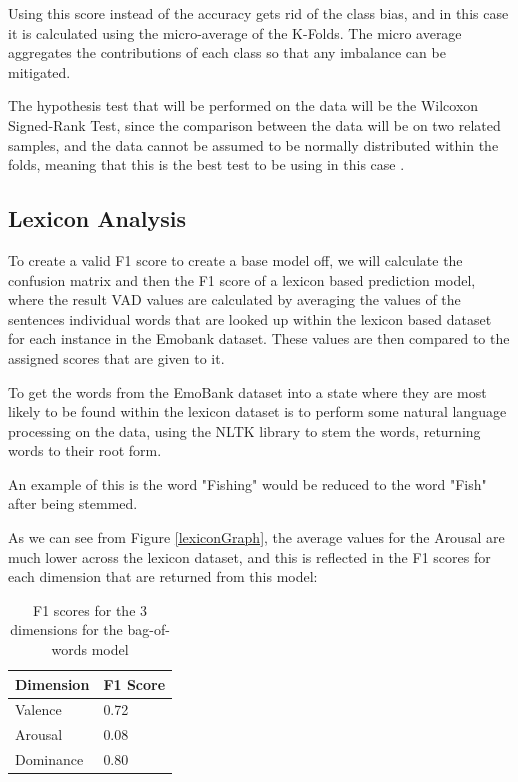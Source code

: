 Using this score instead of the accuracy gets rid of the class bias, and in this case it is calculated using the micro-average of the K-Folds. The micro average aggregates the contributions of each class so that any imbalance can be mitigated.

The hypothesis test that will be performed on the data will be the Wilcoxon Signed-Rank Test, since the comparison between the data will be on two related samples, and the data cannot be assumed to be normally distributed within the folds, meaning that this is the best test to be using in this case \cite{wilcoxon1970critical}.

\subsection{Lexicon Analysis}

To create a valid F1 score to create a base model off, we will calculate the confusion matrix and then the F1 score of a lexicon based prediction model, where the result VAD values are calculated by averaging the values of the sentences individual words that are looked up within the lexicon based dataset \cite{wordsData} for each instance in the Emobank dataset. These values are then compared to the assigned scores that are given to it.

To get the words from the EmoBank dataset into a state where they are most likely to be found within the lexicon dataset is to perform some natural language processing on the data, using the NLTK \cite{NLTKBook} library to stem the words, returning words to their root form.

An example of this is the word "Fishing" would be reduced to the word "Fish" after being stemmed. 

As we can see from Figure \ref{lexiconGraph}, the average values for the Arousal are much lower across the lexicon dataset, and this is reflected in the F1 scores for each dimension that are returned from this model:

\begin{table}
\centering
\label{lexicon:f1}
\caption{F1 scores for the 3 dimensions for the bag-of-words model}
\begin{tabular}{ |p{3cm}|p{3cm}|}
 \hline
  Dimension & F1 Score \\
 \hline
  Valence & 0.72\\
  Arousal & 0.08 \\
  Dominance & 0.80\\
 \hline
\end{tabular}

\end{table}

